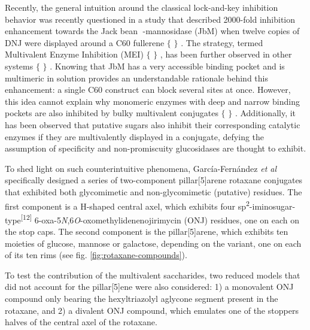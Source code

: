 Recently, the general intuition around the classical lock-and-key inhibition behavior was recently questioned in a study that described 2000-fold inhibition enhancement towards the Jack bean -mannosidase (JbM) when twelve copies of DNJ were displayed around a C60 fullerene $ \{ $ $ \} $ . The strategy, termed Multivalent Enzyme Inhibition (MEI) $ \{ $ $ \} $ , has been further observed in other systems $ \{ $ $ \} $ . Knowing that JbM has a very accessible binding pocket and is multimeric in solution provides an understandable rationale behind this enhancement: a single C60 construct can block several sites at once. However, this idea cannot explain why monomeric enzymes with deep and narrow binding pockets are also inhibited by bulky multivalent conjugates $ \{ $ $ \} $ . Additionally, it has been observed that putative sugars also inhibit their corresponding catalytic enzymes if they are multivalently displayed in a conjugate, defying the assumption of specificity and non-promiscuity glucosidases are thought to exhibit.

To shed light on such counterintuitive phenomena, García-Fernández \textit{et al }specifically designed a series of two-component pillar[5]arene rotaxane conjugates that exhibited both glycomimetic and non-glycomimetic (putative) residues. The first component is a H-shaped central axel, which exhibits four sp\textsuperscript{2}-iminosugar-type\textsuperscript{[12]} 6-oxa-5\textit{N},6\textit{O}-oxomethylidenenojirimycin (ONJ) residues, one on each on the stop caps. The second component is the pillar[5]arene, which exhibits ten moieties of glucose, mannose or galactose, depending on the variant, one on each of its ten rims (see fig. \ref{fig:rotaxane-compounds}).

To test the contribution of the multivalent saccharides, two reduced models that did not account for the pillar[5]ene were also considered: 1) a monovalent ONJ compound only bearing the hexyltriazolyl aglycone segment present in the rotaxane, and 2) a divalent ONJ compound, which emulates one of the stoppers halves of the central axel of the rotaxane.





